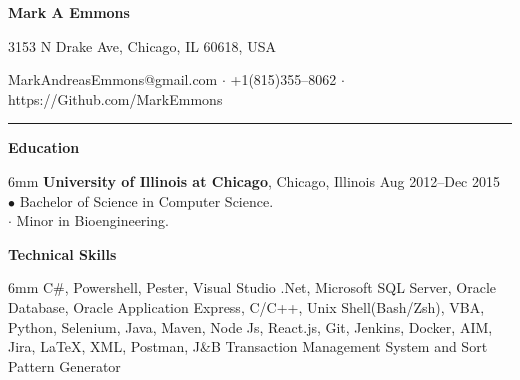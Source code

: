 \documentclass[11pt]{article}
\newcommand{\sectionheader}[1]{\noindent \textbf{\large #1}}
\newenvironment{sectionbody}{\begin{adjustwidth}{6mm}{}}{\end{adjustwidth}}
\begin{document}

\centerline{\LARGE \bf Mark A Emmons}
\centerline{3153 N Drake Ave, Chicago, IL 60618, USA}
\centerline{MarkAndreasEmmons@gmail.com $\cdot$ +1(815)355--8062 $\cdot$ https://Github.com/MarkEmmons}

\noindent\rule{16.5cm}{0.4pt}

\sectionheader{Education}
\begin{sectionbody}
{\bf University of Illinois at Chicago}, Chicago, Illinois \hfill Aug 2012--Dec 2015 \\
$\bullet$ Bachelor of Science in Computer Science. \\
\indent $\cdot$ Minor in Bioengineering. \\
\end{sectionbody}

\vspace{2mm}

\sectionheader{Technical Skills}
\begin{sectionbody}
C\#, Powershell, Pester, Visual Studio .Net, Microsoft SQL Server, Oracle Database, Oracle Application Express, C/C++, Unix Shell(Bash/Zsh), VBA, Python, Selenium, Java, Maven, Node Js, React.js, Git, Jenkins, Docker, AIM, Jira, \LaTeX, XML, Postman, J\&B Transaction Management System and Sort Pattern Generator \\
\end{sectionbody}

\vspace{2mm}
\end{document}

